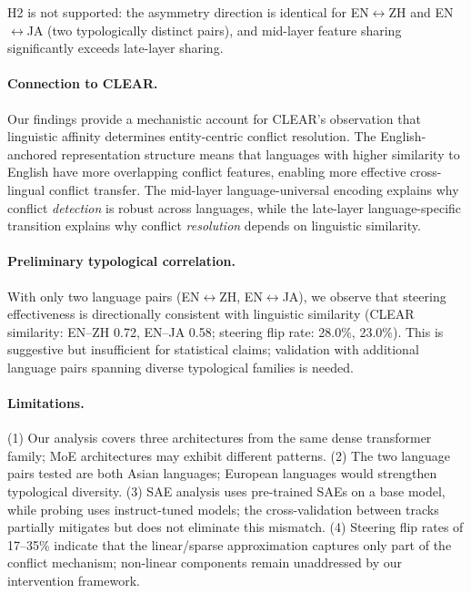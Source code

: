 \documentclass{article}
\begin{document}
H2 is not supported: the asymmetry direction is identical for EN$\leftrightarrow$ZH and EN$\leftrightarrow$JA (two typologically distinct pairs), and mid-layer feature sharing significantly exceeds late-layer sharing.

\paragraph{Connection to CLEAR.}
Our findings provide a mechanistic account for CLEAR's observation that linguistic affinity determines entity-centric conflict resolution. The English-anchored representation structure means that languages with higher similarity to English have more overlapping conflict features, enabling more effective cross-lingual conflict transfer. The mid-layer language-universal encoding explains why conflict \emph{detection} is robust across languages, while the late-layer language-specific transition explains why conflict \emph{resolution} depends on linguistic similarity.

\paragraph{Preliminary typological correlation.}
With only two language pairs (EN$\leftrightarrow$ZH, EN$\leftrightarrow$JA), we observe that steering effectiveness is directionally consistent with linguistic similarity (CLEAR similarity: EN--ZH 0.72, EN--JA 0.58; steering flip rate: 28.0\%, 23.0\%). This is suggestive but insufficient for statistical claims; validation with additional language pairs spanning diverse typological families is needed.

\paragraph{Limitations.}
(1) Our analysis covers three architectures from the same dense transformer family; MoE architectures may exhibit different patterns. (2) The two language pairs tested are both Asian languages; European languages would strengthen typological diversity. (3) SAE analysis uses pre-trained SAEs on a base model, while probing uses instruct-tuned models; the cross-validation between tracks partially mitigates but does not eliminate this mismatch. (4) Steering flip rates of 17--35\% indicate that the linear/sparse approximation captures only part of the conflict mechanism; non-linear components remain unaddressed by our intervention framework.

\end{document}
